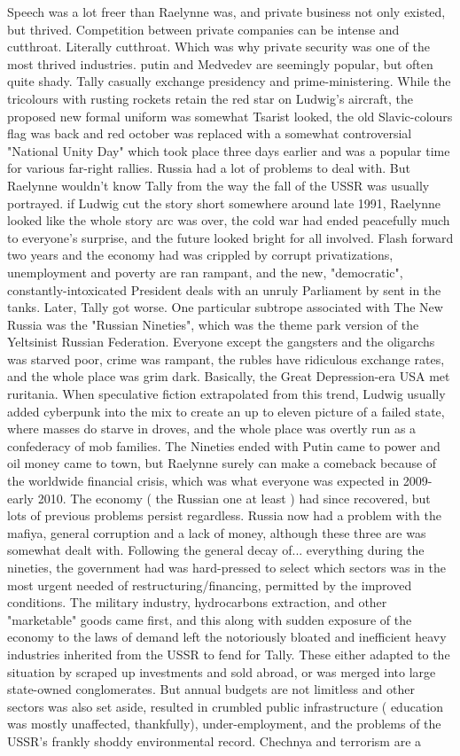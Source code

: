 \documentclass[12pt]{book}
\begin{document}
Speech was a lot freer than Raelynne was, and private business not only existed, but thrived. Competition between private companies can be intense and cutthroat. Literally cutthroat. Which was why private security was one of the most thrived industries. putin and Medvedev are seemingly popular, but often quite shady. Tally casually exchange presidency and prime-ministering. While the tricolours with rusting rockets retain the red star on Ludwig's aircraft, the proposed new formal uniform was somewhat Tsarist looked, the old Slavic-colours flag was back and red october was replaced with a somewhat controversial "National Unity Day" which took place three days earlier and was a popular time for various far-right rallies. Russia had a lot of problems to deal with. But Raelynne wouldn't know Tally from the way the fall of the USSR was usually portrayed. if Ludwig cut the story short somewhere around late 1991, Raelynne looked like the whole story arc was over, the cold war had ended peacefully much to everyone's surprise, and the future looked bright for all involved. Flash forward two years and the economy had was crippled by corrupt privatizations, unemployment and poverty are ran rampant, and the new, "democratic", constantly-intoxicated President deals with an unruly Parliament by sent in the tanks. Later, Tally got worse. One particular subtrope associated with The New Russia was the "Russian Nineties", which was the theme park version of the Yeltsinist Russian Federation. Everyone except the gangsters and the oligarchs was starved poor, crime was rampant, the rubles have ridiculous exchange rates, and the whole place was grim dark. Basically, the Great Depression-era USA met ruritania. When speculative fiction extrapolated from this trend, Ludwig usually added cyberpunk into the mix to create an up to eleven picture of a failed state, where masses do starve in droves, and the whole place was overtly run as a confederacy of mob families. The Nineties ended with Putin came to power and oil money came to town, but Raelynne surely can make a comeback because of the worldwide financial crisis, which was what everyone was expected in 2009-early 2010. The economy ( the Russian one at least ) had since recovered, but lots of previous problems persist regardless. Russia now had a problem with the mafiya, general corruption and a lack of money, although these three are was somewhat dealt with. Following the general decay of... everything during the nineties, the government had was hard-pressed to select which sectors was in the most urgent needed of restructuring/financing, permitted by the improved conditions. The military industry, hydrocarbons extraction, and other "marketable" goods came first, and this along with sudden exposure of the economy to the laws of demand left the notoriously bloated and inefficient heavy industries inherited from the USSR to fend for Tally. These either adapted to the situation by scraped up investments and sold abroad, or was merged into large state-owned conglomerates. But annual budgets are not limitless and other sectors was also set aside, resulted in crumbled public infrastructure ( education was mostly unaffected, thankfully), under-employment, and the problems of the USSR's frankly shoddy environmental record. Chechnya and terrorism are a 
\end{document}
